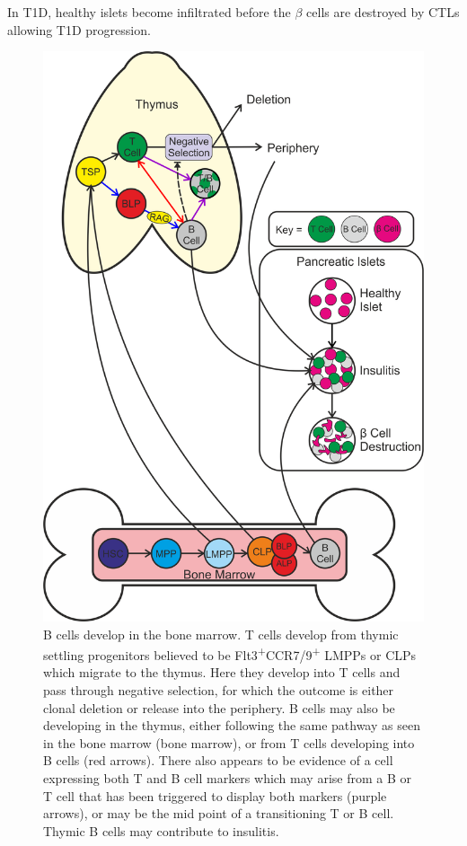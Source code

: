 In T1D, healthy islets become infiltrated before the $\beta$ cells are destroyed by CTLs allowing T1D progression.


\begin{figure}
\includegraphics[width=\textwidth]{Figures/diagram2.png}
\caption[Diagrammatical summary of the project findings]{ 
B cells develop in the bone marrow. 
T cells develop from thymic settling progenitors believed to be Flt3\textsuperscript{+}CCR7/9\textsuperscript{+} LMPPs or CLPs which migrate to the thymus.
Here they develop into T cells and pass through negative selection, for which the outcome is either clonal deletion or release into the periphery.
B cells may also be developing in the thymus, either following the same pathway as seen in the bone marrow (bone marrow), or from T cells developing into B cells (red arrows).
There also appears to be evidence of a cell expressing both T and B cell markers which may arise from a B or T cell that has been triggered to display both markers (purple arrows), or may be the mid point of a transitioning T or B cell.
Thymic B cells may contribute to insulitis.}
\label{fig:summarydiagram2}
\end{figure}


